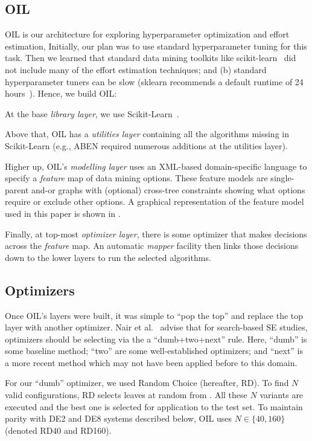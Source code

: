 \subsection{OIL}
\label{sec:5}

  OIL is  our  architecture for exploring hyperparameter optimization and effort estimation,
  Initially, our plan
was to use standard hyperparameter  tuning for this task. Then we learned that standard data mining toolkits like scikit-learn~\cite{pedregosa2011scikit} did not include many of the effort estimation techniques; and (b) standard hyperparameter tuners can be  slow     (sklearn recommends a default runtime of 24 hours~\cite{sk18}).  Hence, we build OIL:
 \bi
 \item
At the base {\em library layer}, we use     Scikit-Learn~\cite{pedregosa2011scikit}. 
\item
Above that, OIL has a {\em utilities layer} containing all the algorithms missing in Scikit-Learn (e.g., ABEN required
numerous additions at the utilities layer). 
\item
Higher up, OIL's {\em modelling layer} uses an XML-based domain-specific language to specify a {\em feature} map of data mining options.
These feature models are single-parent and-or graphs with (optional) cross-tree constraints showing what options require or exclude other options.
A graphical representation of  the feature model used in this paper is shown in .
\item
Finally, at top-most {\em optimizer layer}, there is some optimizer that  makes decisions across the {\em feature} map. An automatic {\em mapper} facility then links those decisions
down to the lower layers to run the selected algorithms.  
\ei

\subsection{Optimizers}
\label{sec:6}

Once OIL's layers were  built, it was simple  to ``pop the top'' and replace the top
layer with another optimizer.
Nair et al.~\cite{nair18}   advise that for search-based SE studies, optimizers should be selecting
via the a 
  ``dumb+two+next''  rule. Here,   ``dumb'' is some baseline method;
``two'' are some  well-established optimizers;  and ``next'' is a more recent method which may not have been
applied before to this domain.

For our ``dumb''  optimizer, we used   Random Choice (hereafter, RD). To find $N$ valid configurations, RD
selects leaves at random from .
All these $N$ variants are executed and the best one is selected for application to the test set. To maintain parity with   DE2 and DE8 systems described below, 
OIL uses  $N\in\{40,160\}$ (denoted RD40 and RD160). 

